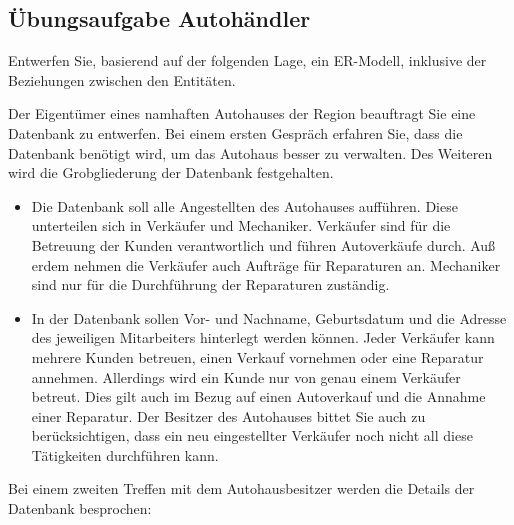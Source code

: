 \subsection{Übungsaufgabe Autohändler}
Entwerfen Sie, basierend auf der folgenden Lage, ein ER-Modell, inklusive der Beziehungen zwischen
den Entitäten.

Der Eigentümer eines namhaften Autohauses der Region beauftragt Sie eine Datenbank zu entwerfen.
Bei einem ersten Gespräch erfahren Sie, dass die Datenbank benötigt wird, um das Autohaus besser zu
verwalten. Des Weiteren wird die Grobgliederung der Datenbank festgehalten.
\begin{itemize}
    \item Die Datenbank soll alle Angestellten des Autohauses aufführen. Diese unterteilen sich in Verkäufer und Mechaniker. Verkäufer sind für die Betreuung der Kunden verantwortlich und führen  Autoverkäufe durch. Auß erdem nehmen die Verkäufer auch Aufträge für Reparaturen an. Mechaniker sind nur für die Durchführung der Reparaturen zuständig.
    \item In der Datenbank sollen Vor- und Nachname, Geburtsdatum und die Adresse des jeweiligen Mitarbeiters
          hinterlegt werden können. Jeder Verkäufer kann mehrere Kunden betreuen, einen Verkauf vornehmen oder eine Reparatur annehmen. Allerdings wird ein Kunde nur von genau einem Verkäufer betreut. Dies gilt auch im Bezug auf einen Autoverkauf und die Annahme einer Reparatur. Der Besitzer des Autohauses bittet Sie auch zu berücksichtigen, dass ein neu eingestellter Verkäufer noch nicht all diese Tätigkeiten durchführen kann.
\end{itemize}
Bei einem zweiten Treffen mit dem Autohausbesitzer werden die Details der Datenbank besprochen:

